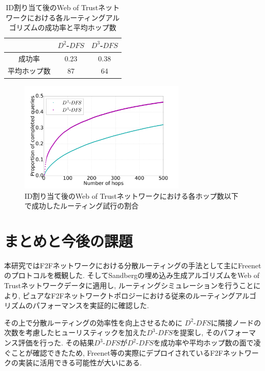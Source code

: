 \documentclass[technicalreport]{./ieicej-v3.0/UTF/ieicej}
\begin{document}
  \begin{table}[htb]
   \begin{center}  
    \begin{tabular}{|c|c|c|} \hline
    & $D^2$-$DFS$ & $D^3$-$DFS$ \\ \hline
    成功率 & 0.23 & 0.38\\ \hline
    平均ホップ数 & 87 & 64\\ \hline
    \end{tabular}
   \end{center}
   \caption{ID割り当て後のWeb of Trustネットワークにおける各ルーティングアルゴリズムの成功率と平均ホップ数}
   \label{table:succ_hops_full}
  \end{table}
  \begin{figure}[htb]
   \centerline{\includegraphics[width=80mm]{../fig/simple_cml_noclip.png}}
   \caption{ID割り当て後のWeb of Trustネットワークにおける各ホップ数以下で成功したルーティング試行の割合}
    \label{fig:simple_cml_noclip}
  \end{figure}

\section{まとめと今後の課題}
本研究ではF2Fネットワークにおける分散ルーティングの手法として主にFreenetのプロトコルを概観した. そしてSandbergの埋め込み生成アルゴリズムをWeb of Trustネットワークデータに適用し, ルーティングシミュレーションを行うことにより, ピュアなF2Fネットワークトポロジーにおける従来のルーティングアルゴリズムのパフォーマンスを実証的に確認した.

その上で分散ルーティングの効率性を向上させるために $D^2$-$DFS$に隣接ノードの次数を考慮したヒューリスティックを加えた$D^3$-$DFS$を提案し, そのパフォーマンス評価を行った. その結果$D^3$-$DFS$が$D^2$-$DFS$を成功率や平均ホップ数の面で凌ぐことが確認できたため, Freenet等の実際にデプロイされているF2Fネットワークの実装に活用できる可能性が大いにある. 
\end{document}
